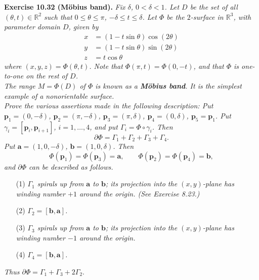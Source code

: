 \documentclass{article}
\begin{document}






\textbf{Exercise 10.32 (M\"obius band).}
\emph{Fix $\delta$, $0 < \delta < 1$.
Let $D$ be the set of all $(\theta,t) \in \mathbb{R}^2$ such that $0 \leq \theta \leq \pi$,
$-\delta \leq t \leq \delta$.
Let $\Phi$ be the $2$-surface in $\mathbb{R}^3$, with parameter domain $D$, given by
\begin{align*}
  x &= (1-t\sin\theta) \cos(2\theta) \\
  y &= (1-t\sin\theta) \sin(2\theta) \\
  z &= t \cos\theta
\end{align*}
where $(x,y,z) = \Phi(\theta,t)$.
Note that $\Phi(\pi,t) = \Phi(0,-t)$, and that $\Phi$ is one-to-one on the rest of $D$.} \\

\emph{The range $M = \Phi(D)$ of $\Phi$ is known as a \textbf{M\"obius band}.
It is the simplest example of a nonorientable surface.} \\

\emph{Prove the various assertions made in the following description:
Put
$\mathbf{p}_1 = (0,-\delta)$,
$\mathbf{p}_2 = (\pi,-\delta)$,
$\mathbf{p}_3 = (\pi,\delta)$,
$\mathbf{p}_4 = (0,\delta)$,
$\mathbf{p}_5 = \mathbf{p}_1$.
Put $\gamma_i = [\mathbf{p}_i,\mathbf{p}_{i+1}]$, $i=1,\ldots,4$,
and put $\Gamma_i = \Phi \circ \gamma_i$.
Then
\[
  \partial \Phi = \Gamma_1 + \Gamma_2 + \Gamma_3 + \Gamma_4.
\]
Put $\mathbf{a} = (1,0,-\delta)$, $\mathbf{b} = (1,0,\delta)$.
Then
\[
  \Phi(\mathbf{p}_1) = \Phi(\mathbf{p}_3) = \mathbf{a},
  \qquad
  \Phi(\mathbf{p}_2) = \Phi(\mathbf{p}_4) = \mathbf{b},
\]
and $\partial \Phi$ can be described as follows.}
\begin{enumerate}
\item[(1)]
  \emph{$\Gamma_1$ spirals up from $\mathbf{a}$ to $\mathbf{b}$;
  its projection into the $(x,y)$-plane has winding number $+1$ around the origin.
  (See Exercise 8.23.)}

\item[(2)]
  \emph{$\Gamma_2 = [\mathbf{b}, \mathbf{a}]$.}

\item[(3)]
  \emph{$\Gamma_3$ spirals up from $\mathbf{a}$ to $\mathbf{b}$;
  its projection into the $(x,y)$-plane has winding number $-1$ around the origin.}

\item[(4)]
  \emph{$\Gamma_4 = [\mathbf{b}, \mathbf{a}]$.}
\end{enumerate}
\emph{Thus $\partial \Phi = \Gamma_1 + \Gamma_3 + 2 \Gamma_2.$} \\
\end{document}
